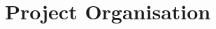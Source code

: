 \documentclass[11pt,a4paper]{article}
\begin{document}
\section{Project Organisation}















%
%
%
%
\end{document}
